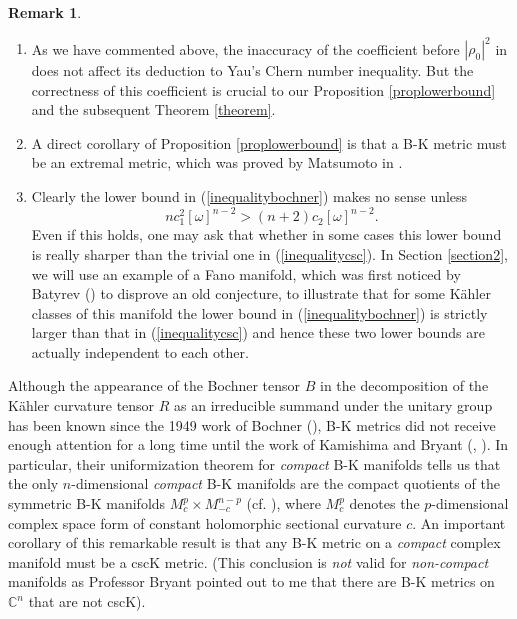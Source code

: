 \documentclass[11pt]{amsart}
\theoremstyle{definition}
\newtheorem{remark}[theorem]{Remark}
\theoremstyle{remark}
\numberwithin{equation}{section}
\begin{document}
\begin{remark}\label{remark1}~
\begin{enumerate}
\item
As we have commented above, the inaccuracy of the coefficient before
$|\rho_0|^2$ in \cite[(2.80a)]{Be} does not affect its deduction to
Yau's Chern number inequality. But the correctness of this
coefficient is crucial to our Proposition \ref{proplowerbound} and
the subsequent Theorem \ref{theorem}.

\item
A direct corollary of Proposition \ref{proplowerbound} is that a B-K
metric must be an extremal metric, which was proved by Matsumoto in
\cite{Ma}.

\item
Clearly the lower bound in (\ref{inequalitybochner}) makes no sense
unless
$$nc_1^2[\omega]^{n-2}>(n+2)c_2[\omega]^{n-2}.$$
Even if this holds, one may ask that whether in some cases this
lower bound is really sharper than the trivial one in
(\ref{inequalitycsc}). In Section \ref{section2}, we will use an
example of a Fano manifold, which was first noticed by Batyrev
(\cite{Ba}) to disprove an old conjecture, to illustrate that for
some K\"{a}hler classes of this manifold the lower bound in
(\ref{inequalitybochner}) is strictly larger than that in
(\ref{inequalitycsc}) and hence these two lower bounds are actually
independent to each other.
\end{enumerate}
\end{remark}

Although the appearance of the Bochner tensor $B$ in the
decomposition of the K\"{a}hler curvature tensor $R$ as an
irreducible summand under the unitary group has been known since the
1949 work of Bochner (\cite{Bo}), B-K metrics did not receive enough
attention for a long time until the work of Kamishima and Bryant
(\cite{Ka}, \cite{Br}). In particular, their  uniformization theorem
for \emph{compact} B-K manifolds tells us that the only
$n$-dimensional \emph{compact} B-K manifolds are the compact
quotients of the symmetric B-K manifolds $M^p_c\times M^{n-p}_{-c}$
(cf. \cite[p. 682]{Bo}), where $M^p_c$ denotes the $p$-dimensional
complex space form of constant holomorphic sectional curvature $c$.
An important corollary of this remarkable result is that any B-K
metric on a \emph{compact} complex manifold must be a cscK metric.
(This conclusion is \emph{not} valid for \emph{non-compact}
manifolds as Professor Bryant pointed out to me that there are B-K
metrics on $\mathbb{C}^n$ that are not cscK).
\end{document}

